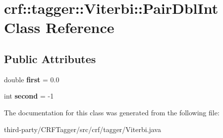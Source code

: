 \hypertarget{classcrf_1_1tagger_1_1Viterbi_1_1PairDblInt}{
\section{crf::tagger::Viterbi::PairDblInt Class Reference}
\label{classcrf_1_1tagger_1_1Viterbi_1_1PairDblInt}
}
\subsection*{Public Attributes}
\begin{DoxyCompactItemize}
\item 
\hypertarget{classcrf_1_1tagger_1_1Viterbi_1_1PairDblInt_ad534732fd2cbe203e1b7055beb652b2a}{
double {\bfseries first} = 0.0}
\label{classcrf_1_1tagger_1_1Viterbi_1_1PairDblInt_ad534732fd2cbe203e1b7055beb652b2a}

\item 
\hypertarget{classcrf_1_1tagger_1_1Viterbi_1_1PairDblInt_a80e75bb3293901ba3b79cd0a0a5c3c67}{
int {\bfseries second} = -\/1}
\label{classcrf_1_1tagger_1_1Viterbi_1_1PairDblInt_a80e75bb3293901ba3b79cd0a0a5c3c67}

\end{DoxyCompactItemize}


The documentation for this class was generated from the following file:\begin{DoxyCompactItemize}
\item 
third-\/party/CRFTagger/src/crf/tagger/Viterbi.java\end{DoxyCompactItemize}
